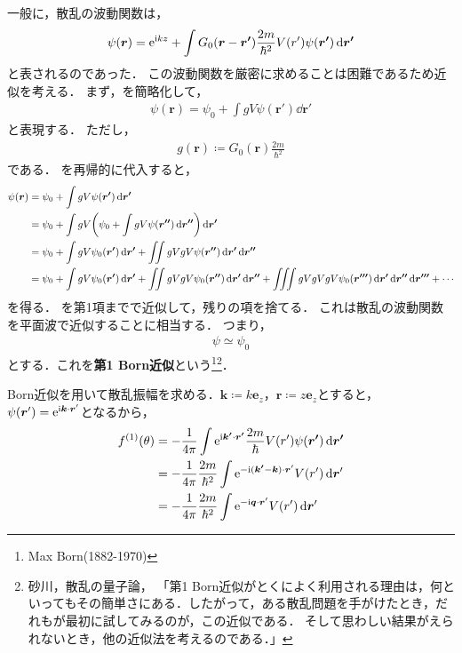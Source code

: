 \documentclass{report}
\begin{document}
  一般に，散乱の波動関数は，
  \begin{align}
    \psi(\bm{r}) = \mathrm{e}^{\mathrm{i} kz} + \int G_0 (\bm{r} - \bm{r'}) \frac{2m}{\hbar^2} V(r') \psi(\bm{r'}) \dd{\bm{r'}}\label{wave-funtion-of-scattering}
  \end{align}
  と表されるのであった．
  この波動関数を厳密に求めることは困難であるため近似を考える．
  まず，を簡略化して，
  \begin{align}
    \psi(\bm{r}) = \psi_0 + \int g V \psi(\bm{r}') \dd{\bm{r}'}\label{simple-wave-funtion-of-scattering}
  \end{align}
  と表現する．
  ただし，
  \begin{align}
    g(\bm{r}) \coloneqq G_0(\bm{r})\frac{2m}{\hbar^2}
  \end{align}
  である．
  を再帰的に代入すると，
  \begin{align}
    \psi(\bm{r}) &= \psi_0 + \int g V \psi(\bm{r'}) \dd{\bm{r'}} \\
    &= \psi_0 + \int gV \qty(\psi_0 + \int g V \psi(\bm{r''}) \dd{\bm{r''}}) \dd{\bm{r'}} \\
    &= \psi_0 + \int g V \psi_0(\bm{r'}) \dd{\bm{r'}} + \iint gVgV \psi(\bm{r''}) \dd{\bm{r'}} \dd{\bm{r''}} \\
    &= \psi_0 + \int g V \psi_0(\bm{r'}) \dd{\bm{r'}} + \iint gVgV \psi_0(\bm{r''}) \dd{\bm{r'}} \dd{\bm{r''}} + \iiint gVgVgV \psi_0(\bm{r'''}) \dd{\bm{r'}} \dd{\bm{r''}} \dd{\bm{r'''}} + \cdots\label{dozens-of-gv}
  \end{align}
  を得る．
  を第1項までで近似して，残りの項を捨てる．
  これは散乱の波動関数を平面波で近似することに相当する．
  つまり，
  \begin{align}
    \psi \simeq \psi_0
  \end{align}
  とする．これを\textbf{第1 Born近似}という\footnote{Max Born(1882-1970)}\footnote{砂川，散乱の量子論，
  「第1 Born近似がとくによく利用される理由は，何といってもその簡単さにある．したがって，ある散乱問題を手がけたとき，だれもが最初に試してみるのが，この近似である．
  そして思わしい結果がえられないとき，他の近似法を考えるのである．」}．
  \par
  Born近似を用いて散乱振幅を求める．$\bm{k} \coloneqq k\bm{e}_z$，$\bm{r} \coloneqq z\bm{e}_z$とすると，
  $\psi(\bm{r}') = \mathrm{e}^{\mathrm{i} \bm{k}\cdot\bm{r}'}$となるから，
  \begin{align}
    f^{(1)}(\theta) &= -\frac{1}{4\pi} \int \mathrm{e}^{\mathrm{i} \bm{k'}\cdot\bm{r'}} \frac{2m}{\hbar} V(r') \psi(\bm{r'}) \dd{\bm{r'}} \\
    &= -\frac{1}{4\pi}\frac{2m}{\hbar^2}\int\mathrm{e}^{-\mathrm{i} (\bm{k'} - \bm{k})\cdot\bm{r}'} V(r') \dd{\bm{r}'} \\
    &= -\frac{1}{4\pi}\frac{2m}{\hbar^2}\int\mathrm{e}^{-\mathrm{i} \bm{q} \cdot \bm{r}'} V(r') \dd{\bm{r}'}\label{potential-fourier-transform}
  \end{align}
\end{document}
